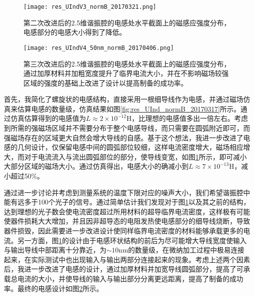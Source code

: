             \begin{figure}[h]
                \centering
                \texttt{[image: res\_UIndV3\_normB\_20170321.png]}
                \caption{第二次改进后的2.5维谐振腔的电感处水平截面上的磁感应强度分布，电感部分的电感大小得到了降低。}
                \label{fig:res_UIndV3_normB_20170321}
            \end{figure}

            

            \begin{figure}[h]
                \centering
                \texttt{[image: res\_UIndV4\_50nm\_normB\_20170406.png]}
                \caption{第三次改进后的2.5维谐振腔的电感处水平截面上的磁感应强度分布，通过加厚材料并加粗宽度提升了临界电流大小，并在不影响磁场较强区域的强度的基础上改进了设计以提高制备的成功率。}
                \label{fig:res_UIndV4_50nm_normB_20170406}
            \end{figure}


            首先，我简化了螺旋状的电感结构，直接采用一根细导线作为电感，并通过磁场仿真来估算电感的数量级，仿真结果如图\ref{fig:res_UInd_normB_20170317}所示。通过仿真估算得到的电感值为$L\approx 2\times 10^{-12} \mathrm{H} $，比理想的电感值多出一倍左右。考虑到所需的强磁场区域并不需要分布于整个电感导线，而只需要在圆弧附近即可，而强磁场存在的区域更大自然会增大导线的自感。基于这个想法，我进一步改进了电感的几何设计，仅保留电感中间的圆弧部位较细，这样电流密度增大，磁场相应增大，而对于电流流入与流出圆弧部位的部分，使导线变宽，如图\ref{fig:res_UIndV3_normB_20170321}所示，即可减小大部分区域的磁场大小。通过仿真得出，电感大小的确减小到$L \approx 7\times 10^{-13} \mathrm{H} $，减小超过50\%。

            通过进一步讨论并考虑到测量系统的温度下限对应的噪声大小，我们希望谐振腔中能有远多于100个光子的信号。通过简单估计我们发现对于图\ref{fig:res_UIndV3_normB_20170321}以及其之前的结构，达到理想的光子数会使电流密度超过所用材料的超导临界电流密度，这样极有可能使器件损耗大大增加，并且因非超导态的电阻发热使电感部分的细导线烧断，导致器件损毁，因此需要进一步改进设计使同样临界电流密度的材料能够承载更多的电流。另一方面，图\ref{fig:res_UIndV3_normB_20170321}的设计由于电感环状结构的前后为尽可能增大导线宽度使输入与输出导线中部距离十分靠近，为$\sim 10 \mathrm{nm} $的数量级，在微纳加工过程中极易连接起来，在实际测试中也出现输入与输出两部分连接起来的现象。考虑上述两个因素后，我进一步改进了电感的设计，通过加厚材料并加宽导线圆弧部分，提高了可承载总电流的大小，并使导线的输入与输出部分分离更远距离，提高了制备的成功率。最终的电感设计如图\ref{fig:res_UIndV4_50nm_normB_20170406}所示。

